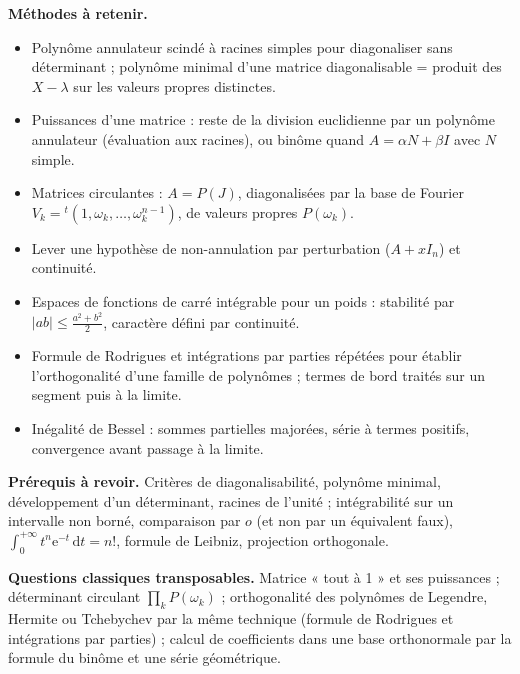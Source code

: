 \documentclass[11pt,a4paper]{article}
\providecommand{\tightlist}{\setlength{\itemsep}{0pt}\setlength{\parskip}{0pt}}
\begin{document}
\textbf{Méthodes à retenir.}

\begin{itemize}
\tightlist
\item
  Polynôme annulateur scindé à racines simples pour diagonaliser sans déterminant ; polynôme minimal d'une matrice diagonalisable = produit des \(X-\lambda\) sur les valeurs propres distinctes.
\item
  Puissances d'une matrice : reste de la division euclidienne par un polynôme annulateur (évaluation aux racines), ou binôme quand \(A=\alpha N+\beta I\) avec \(N\) simple.
\item
  Matrices circulantes : \(A=P(J)\), diagonalisées par la base de Fourier \(V_k={}^t(1,\omega_k,\dots,\omega_k^{n-1})\), de valeurs propres \(P(\omega_k)\).
\item
  Lever une hypothèse de non-annulation par perturbation (\(A+xI_n\)) et continuité.
\item
  Espaces de fonctions de carré intégrable pour un poids : stabilité par \(|ab|\le\frac{a^2+b^2}2\), caractère défini par continuité.
\item
  Formule de Rodrigues et intégrations par parties répétées pour établir l'orthogonalité d'une famille de polynômes ; termes de bord traités sur un segment puis à la limite.
\item
  Inégalité de Bessel : sommes partielles majorées, série à termes positifs, convergence avant passage à la limite.
\end{itemize}

\textbf{Prérequis à revoir.} Critères de diagonalisabilité, polynôme minimal, développement d'un déterminant, racines de l'unité ; intégrabilité sur un intervalle non borné, comparaison par \(o\) (et non par un équivalent faux), \(\int_0^{+\infty}t^n\mathrm e^{-t}\,\mathrm dt=n!\), formule de Leibniz, projection orthogonale.

\textbf{Questions classiques transposables.} Matrice « tout à 1 » et ses puissances ; déterminant circulant \(\prod_kP(\omega_k)\) ; orthogonalité des polynômes de Legendre, Hermite ou Tchebychev par la même technique (formule de Rodrigues et intégrations par parties) ; calcul de coefficients dans une base orthonormale par la formule du binôme et une série géométrique.
\end{document}
